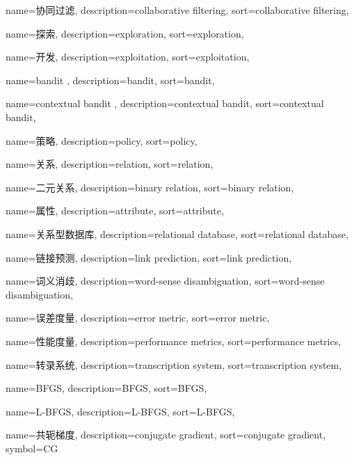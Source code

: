 {
  name=协同过滤,
  description={collaborative filtering},
  sort={collaborative filtering},
}

{
  name=探索,
  description={exploration},
  sort={exploration},
}

{
  name=开发,
  description={exploitation},
  sort={exploitation},
}

{
  name=bandit ,
  description={bandit},
  sort={bandit},
}

{
  name=contextual bandit ,
  description={contextual bandit},
  sort={contextual bandit},
}

{
  name=策略,
  description={policy},
  sort={policy},
}

{
  name=关系,
  description={relation},
  sort={relation},
}

{
  name=二元关系,
  description={binary relation},
  sort={binary relation},
}

{
  name=属性,
  description={attribute},
  sort={attribute},
}

{
  name=关系型数据库,
  description={relational database},
  sort={relational database},
}

{
  name=链接预测,
  description={link prediction},
  sort={link prediction},
}

{
  name=词义消歧,
  description={word-sense disambiguation},
  sort={word-sense disambiguation},
}

{
  name=误差度量,
  description={error metric},
  sort={error metric},
}

{
  name=性能度量,
  description={performance metrics},
  sort={performance metrics},
}

{
  name=转录系统,
  description={transcription system},
  sort={transcription system},
}

{
  name=BFGS,
  description={BFGS},
  sort={BFGS},
}

{
  name=L-BFGS,
  description={L-BFGS},
  sort={L-BFGS},
}

{
  name=共轭梯度,
  description={conjugate gradient},
  sort={conjugate gradient},
  symbol={CG}
}


